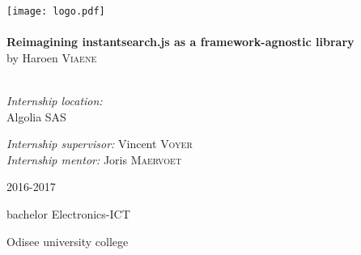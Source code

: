 \begin{titlepage}
\begin{center}
\texttt{[image: logo.pdf]}~\\[1cm]

\HRule \\[0.4cm]
{ \LARGE \bfseries Reimagining instantsearch.js as a framework-agnostic library}\\[0.4cm]
{by Haroen \textsc{Viaene}}\\[0.2cm]

\HRule \\[1.5cm]

\begin{minipage}{0.49\textwidth}
\begin{flushleft} \large
\emph{Internship location:}\\
Algolia SAS\\

\end{flushleft}
\end{minipage}
\begin{minipage}{0.49\textwidth}
\begin{flushright} \large
\emph{Internship supervisor:}
Vincent \textsc{Voyer}\\
\emph{Internship mentor:}
Joris \textsc{Maervoet}\\
\end{flushright}
\end{minipage}

\vfill

{\large 2016-2017}

{\large{bachelor Electronics-ICT}}

{\large Odisee university college}

\end{center}
\end{titlepage}
